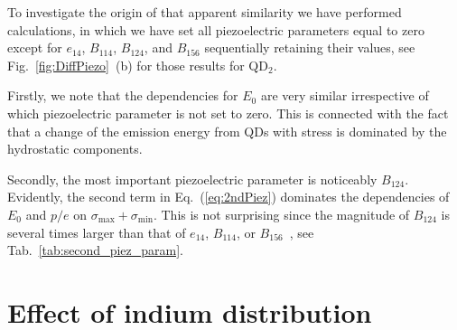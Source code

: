 %


To investigate the origin of that apparent similarity we have performed calculations, in which we have set all piezoelectric parameters equal to zero except for $e_{14}$, $B_{114}$, $B_{124}$, and $B_{156}$ sequentially retaining their values, see Fig.~\ref{fig:DiffPiezo}~(b) for those results for QD$_2$. 


Firstly, we note that the dependencies for $E_0$ are very similar irrespective of which piezoelectric parameter is not set to zero. This is connected with the fact that a change of the emission energy from QDs with stress is dominated by the hydrostatic components.

Secondly, the most important piezoelectric parameter is noticeably $B_{124}$. Evidently, the second term in Eq.~(\ref{eq:2ndPiez}) dominates the dependencies of $E_0$ and $p/e$ on $\sigma_{\mathrm{max}}+\sigma_{\mathrm{min}}$. This is not surprising since the magnitude of $B_{124}$ is several times larger than that of $e_{14}$, $B_{114}$, or $B_{156}$~\cite{Beya-Wakata2011}, see Tab.~\ref{tab:second_piez_param}. 


\section{Effect of indium distribution}

